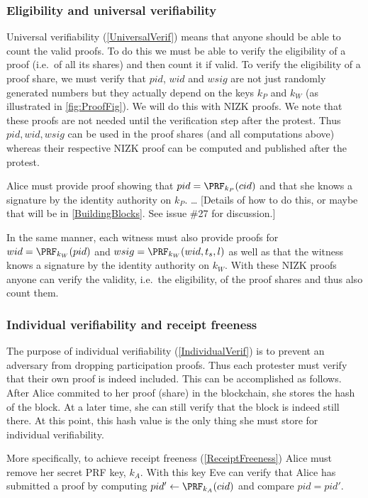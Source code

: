 \subsubsection{Eligibility and universal verifiability}

Universal verifiability (\cref{UniversalVerif}) means that anyone should be able 
to count the valid proofs.
To do this we must be able to verify the eligibility of a proof (i.e.\ of all 
its shares) and then count it if valid.
To verify the eligibility of a proof share, we must verify that \(pid\), \(wid\) 
and \(wsig\) are not just randomly generated numbers but they actually depend on 
the keys \(k_P\) and \(k_W\) (as illustrated in \cref{fig:ProofFig}).
We will do this with \ac{NIZK} proofs.
We note that these proofs are not needed until the verification step after the 
protest.
Thus \(pid, wid, wsig\) can be used in the proof shares (and all computations 
above) whereas their respective \ac{NIZK} proof can be computed and published 
after the protest.

Alice must provide  proof showing that \(pid = \PRF_{k_P}(cid)\) and 
that she knows a signature by the identity authority on \(k_P\).
\dots
[Details of how to do this, or maybe that will be in \cref{BuildingBlocks}. See 
issue \#27 for discussion.]

In the same manner, each witness must also provide  proofs for \(wid = 
  \PRF_{k_W}(pid)\) and \(wsig = \PRF_{k_W}(wid, t_s, l)\) as well as that the 
witness knows a signature by the identity authority on \(k_W\).
With these \ac{NIZK} proofs anyone can verify the validity, i.e.\ the 
eligibility, of the proof shares and thus also count them.

\subsubsection{Individual verifiability and receipt freeness}

The purpose of individual verifiability (\cref{IndividualVerif}) is to prevent 
an adversary from dropping participation proofs.
Thus each protester must verify that their own proof is indeed included.
This can be accomplished as follows.
After Alice commited to her proof (share) in the blockchain, she stores the hash 
of the block.
At a later time, she can still verify that the block is indeed still there.
At this point, this hash value is the only thing she must store for individual 
verifiability.

More specifically, to achieve receipt freeness (\cref{ReceiptFreeness}) Alice 
must remove her secret \ac{PRF} key, \(k_A\).
With this key Eve can verify that Alice has submitted a proof by computing 
\(pid'\gets \PRF_{k_A}(cid)\) and compare \(pid = pid'\).
